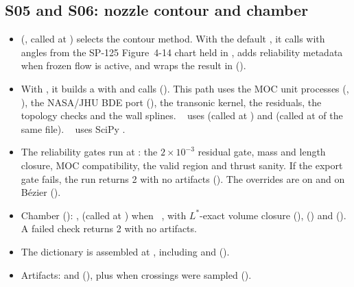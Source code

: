 \subsection{S05 and S06: nozzle contour and chamber}\label{sec:df-s05s06}
\begin{itemize}
  \item {} (, called at ) selects the contour method. With the default , it calls  with angles from the SP-125 Figure~4-14 chart held in , adds reliability metadata when frozen flow is active, and wraps the result in  ().
  \item With , it builds a  with  and calls  (). This path uses the MOC unit processes (, ), the NASA/JHU BDE port (), the transonic kernel, the residuals, the topology checks and the wall splines. ~ uses  (called at ) and  (called at  of the same file). ~ uses SciPy .
  \item The reliability gates run at : the $2\times10^{-3}$ residual gate, mass and length closure, MOC compatibility, the valid region and thrust sanity. If the export gate fails, the run returns 2 with no artifacts (). The overrides are  on  and  on B\'ezier ().
  \item Chamber (): ,  (called at ) when ~,  with $L^*$-exact volume closure (),  () and  (). A failed check returns 2 with no artifacts.
  \item The  dictionary is assembled at , including  and  ().
  \item Artifacts:  and  (), plus  when crossings were sampled ().
\end{itemize}

